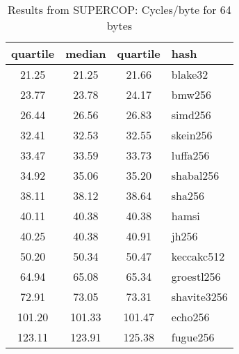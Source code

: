 \begin{table}
  \centering
  \begin{tabular}{ | c | c | c | l | }
    \hline
    \textbf{quartile} & \textbf{median} & \textbf{quartile} & \textbf{hash} \\ \hline
    21.25 & 21.25 & 21.66 & blake32 \\ \hline
    23.77 & 23.78 & 24.17 & bmw256 \\ \hline
    26.44 & 26.56 & 26.83 & simd256 \\ \hline
    32.41 & 32.53 & 32.55 & skein256 \\ \hline
    33.47 & 33.59 & 33.73 & luffa256 \\ \hline
    34.92 & 35.06 & 35.20 & shabal256 \\ \hline
    38.11 & 38.12 & 38.64 & sha256 \\ \hline
    40.11 & 40.38 & 40.38 & hamsi \\ \hline
    40.25 & 40.38 & 40.91 & jh256 \\ \hline
    50.20 & 50.34 & 50.47 & keccakc512 \\ \hline
    64.94 & 65.08 & 65.34 & groestl256 \\ \hline
    72.91 & 73.05 & 73.31 & shavite3256 \\ \hline
    101.20 & 101.33 & 101.47 & echo256 \\ \hline
    123.11 & 123.91 & 125.38 & fugue256 \\ \hline
  \end{tabular}
  \caption{Results from SUPERCOP: Cycles/byte for 64 bytes}
  \label{tbl:supercop:64}
\end{table}
